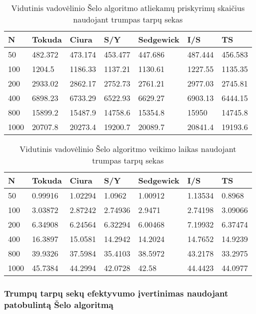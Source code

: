 \documentclass{VUMIFInfKursinis}
\begin{document}
\begin{table}[H]
  \caption{Vidutinis vadovėlinio Šelo algoritmo atliekamų priskyrimų skaičius naudojant trumpas tarpų sekas}
  \begin{tabular}{|l|l|l|l|l|l|l|}
  \hline
  N    & Tokuda  & Ciura   & S/Y     & Sedgewick & I/S     & TS      \\ \hline
  50   & 482.372 & 473.174 & 453.477 & 447.686   & 487.444 & 456.583 \\ \hline
  100  & 1204.5  & 1186.33 & 1137.21 & 1130.61   & 1227.55 & 1135.35 \\ \hline
  200  & 2933.02 & 2862.17 & 2752.73 & 2761.21   & 2977.03 & 2745.81 \\ \hline
  400  & 6898.23 & 6733.29 & 6522.93 & 6629.27   & 6903.13 & 6444.15 \\ \hline
  800  & 15899.2 & 15487.9 & 14758.6 & 15354.8   & 15950   & 14745.8 \\ \hline
  1000 & 20707.8 & 20273.4 & 19200.7 & 20089.7   & 20841.4 & 19193.6 \\ \hline
  \end{tabular}
\end{table}

\begin{table}[H]
  \caption{Vidutinis vadovėlinio Šelo algoritmo veikimo laikas naudojant trumpas tarpų sekas}
  \begin{tabular}{|l|l|l|l|l|l|l|}
  \hline
  N    & Tokuda  & Ciura   & S/Y     & Sedgewick & I/S     & TS      \\ \hline
  50   & 0.99916 & 1.02294 & 1.0962  & 1.00912   & 1.13534 & 0.8968  \\ \hline
  100  & 3.03872 & 2.87242 & 2.74936 & 2.9471    & 2.74198 & 3.09066 \\ \hline
  200  & 6.34908 & 6.24564 & 6.32294 & 6.00468   & 7.19932 & 6.37474 \\ \hline
  400  & 16.3897 & 15.0581 & 14.2942 & 14.2024   & 14.7652 & 14.9239 \\ \hline
  800  & 39.9326 & 37.5984 & 35.4103 & 38.5972   & 43.2178 & 33.2975 \\ \hline
  1000 & 45.7384 & 44.2994 & 42.0728 & 42.58     & 44.4423 & 44.0977 \\ \hline
  \end{tabular}
\end{table}

\subsubsection{Trumpų tarpų sekų efektyvumo įvertinimas naudojant patobulintą Šelo algoritmą}
\end{document}
